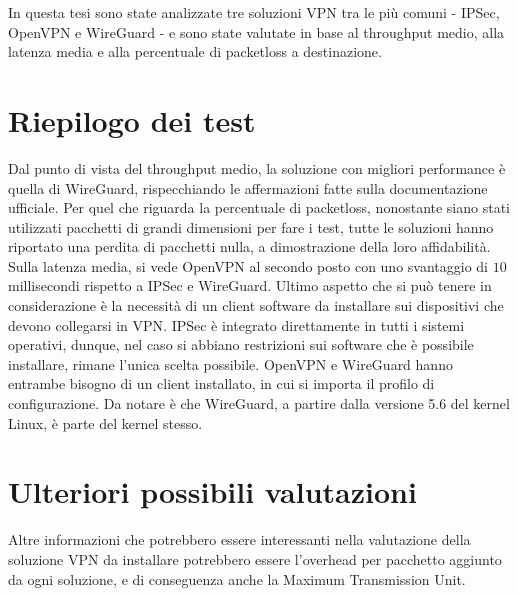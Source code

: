 In questa tesi sono state analizzate tre soluzioni VPN tra le più comuni - IPSec, OpenVPN e WireGuard - e sono state valutate in base al throughput medio, alla latenza media e alla percentuale di packetloss a destinazione.

\section{Riepilogo dei test}
Dal punto di vista del throughput medio, la soluzione con migliori performance è quella di WireGuard, rispecchiando le affermazioni fatte sulla documentazione ufficiale.
Per quel che riguarda la percentuale di packetloss, nonostante siano stati utilizzati pacchetti di grandi dimensioni per fare i test, tutte le soluzioni hanno riportato una perdita di pacchetti nulla, a dimostrazione della loro affidabilità.
Sulla latenza media, si vede OpenVPN al secondo posto con uno svantaggio di $10$ millisecondi rispetto a IPSec e WireGuard.
Ultimo aspetto che si può tenere in considerazione è la necessità di un client software da installare sui dispositivi che devono collegarsi in VPN.
IPSec è integrato direttamente in tutti i sistemi operativi, dunque, nel caso si abbiano restrizioni sui software che è possibile installare, rimane l'unica scelta possibile.
OpenVPN e WireGuard hanno entrambe bisogno di un client installato, in cui si importa il profilo di configurazione. Da notare è che WireGuard, a partire dalla versione 5.6 del kernel Linux, è parte del kernel stesso.

\section{Ulteriori possibili valutazioni}
Altre informazioni che potrebbero essere interessanti nella valutazione della soluzione VPN da installare potrebbero essere l'overhead per pacchetto aggiunto da ogni soluzione, e di conseguenza anche la Maximum Transmission Unit.
